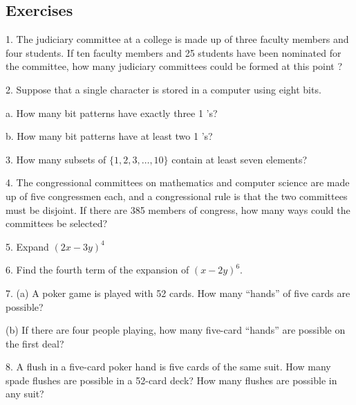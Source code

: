 \documentclass[10pt,]{book}
\theoremstyle{plain}
\theoremstyle{definition}
\begin{document}
\subsection[Exercises]{Exercises}\label{exercises-2-4}
\hypertarget{exercisegroup-17}{}\begin{exercisegroup}
\item[1.]\hypertarget{exercise-84}{} The judiciary committee at a college is made up of three faculty members and four students. If ten faculty members and 25 students have been nominated for the committee, how many judiciary committees could be formed at this point	?\par\smallskip
\item[2.]\hypertarget{exercise-85}{} Suppose that a single character is stored in a computer using eight bits.%
\par
a. How many bit patterns have exactly three 1 's?%
\par
b. How many bit patterns have at least two 1 's?%
\par\smallskip
\item[3.]\hypertarget{exercise-86}{} How many subsets of \(\{1, 2, 3, \dots , 10\}\) contain at least seven elements?\par\smallskip
\item[4.]\hypertarget{exercise-87}{} The congressional committees on mathematics and computer science are made up of five congressmen each, and a congressional rule is that the two committees must be disjoint. If there are 385 members of congress, how many ways could the committees be selected?
  \par\smallskip
\item[5.]\hypertarget{exercise-88}{}Expand \( ( 2x - 3y )^4\)\par\smallskip
\item[6.]\hypertarget{exercise-89}{}Find the fourth term of the expansion of \((x -2y)^6\).\par\smallskip
\item[7.]\hypertarget{exercise-90}{}(a) A poker game is played with 52 cards. How many ``hands'' of five cards are possible?%
\par
(b) If there are four people playing, how many five-card ``hands'' are possible on the first deal?%
\par\smallskip
\item[8.]\hypertarget{exercise-91}{} A flush in a five-card poker hand is five cards of the same suit. How many spade flushes are possible in a 52-card deck? How many flushes are possible in any suit?\par\smallskip

\end{exercisegroup}
\end{document}
